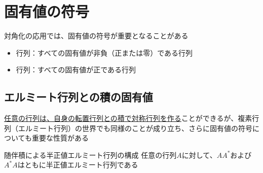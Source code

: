 \documentclass[../../../topic_linear-algebra]{subfiles}
\begin{document}
\sectionline
\section{固有値の符号}

対角化の応用では、固有値の符号が重要となることがある

\begin{itemize}
  \item {}行列：すべての固有値が非負（正または零）である行列
  \item {}行列：すべての固有値が正である行列
\end{itemize}

\subsection{エルミート行列との積の固有値}

\hyperref[thm:symmetric-products-of-any-matrix]{任意の行列は、自身の転置行列との積で対称行列を作る}ことができるが、複素行列（エルミート行列）の世界でも同様のことが成り立ち、さらに固有値の符号についても重要な性質がある

\begin{theorem}{随伴積による半正値エルミート行列の構成}
  任意の行列$A$に対して、$AA^*$および$A^*A$はともに半正値エルミート行列である
\end{theorem}
\end{document}
